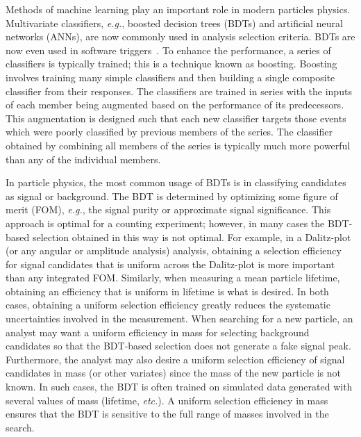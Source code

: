 Methods of machine learning play an important role in modern particles physics. 
Multivariate classifiers, {\em e.g.}, boosted decision trees (BDTs) and artificial neural networks (ANNs), are now commonly used in analysis selection criteria. BDTs are now even used in software triggers~\cite{ref:lhcbhlt,ref:bbdt}. 
To enhance the performance, a series of classifiers is typically trained; this is a technique known as boosting.
Boosting  involves training many simple classifiers and then building a single composite classifier from their responses.
The classifiers are trained in series with the inputs of each member being augmented based on the performance of its predecessors.  This augmentation is designed such that each new classifier targets those events which were poorly classified by previous members of the series.  The classifier obtained by combining all members of the series is typically much more powerful than any of the individual members. 

In particle physics, the most common usage of BDTs is in classifying candidates as signal or background.  The BDT is determined by optimizing some figure of merit (FOM), {\em e.g.}, the signal purity or approximate signal significance.  This approach is optimal for a counting experiment; however, in many cases the BDT-based selection obtained in this way is not optimal.  
For example, in a Dalitz-plot (or any angular or amplitude analysis) analysis, obtaining a selection efficiency for signal candidates that is uniform across the Dalitz-plot is more important than any integrated FOM.  Similarly, when measuring a mean particle lifetime, obtaining an efficiency that is uniform in lifetime is what is desired.  In both cases, obtaining a uniform selection efficiency greatly reduces the systematic uncertainties involved in the measurement.  
When searching for a new particle, an analyst may want a uniform efficiency in mass for selecting background candidates so that the BDT-based selection does not generate a fake signal peak.  Furthermore, the analyst may also desire a uniform selection efficiency of signal candidates in mass (or other variates) since the mass of the new particle is not known.  In such cases, the BDT is often trained on simulated data generated with several values of mass (lifetime, {\em etc.}).  A uniform selection efficiency in mass ensures that the BDT is sensitive to the full range of masses involved in the search. 
